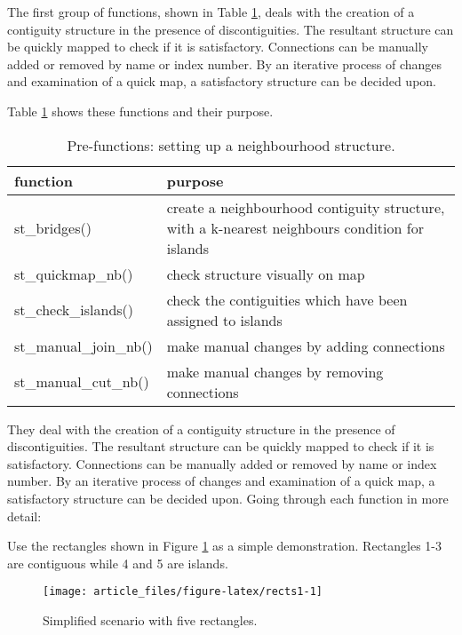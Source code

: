 The first group of functions, shown in Table \ref{tab:prefunc-latex}, deals with the creation
of a contiguity structure in the presence of discontiguities. The
resultant structure can be quickly mapped to check if it is
satisfactory. Connections can be manually added or removed by name or
index number. By an iterative process of changes and examination of a
quick map, a satisfactory structure can be decided upon.

Table \ref{tab:prefunc-latex} shows these functions and their purpose.

\begin{table}

\caption{\label{tab:prefunc-latex}Pre-functions: setting up a neighbourhood structure.}
\centering
\fontsize{9}{11}\selectfont
\begin{tabular}[t]{l|>{\raggedright\arraybackslash}p{7cm}}
\hline
function & purpose\\
\hline
st\_bridges() & create a neighbourhood contiguity structure, with a k-nearest neighbours condition for islands\\
\hline
st\_quickmap\_nb() & check structure visually on map\\
\hline
st\_check\_islands() & check the contiguities which have been assigned to islands\\
\hline
st\_manual\_join\_nb() & make manual changes by adding connections\\
\hline
st\_manual\_cut\_nb() & make manual changes by removing connections\\
\hline
\end{tabular}
\end{table}

They deal with the creation
of a contiguity structure in the presence of discontiguities. The
resultant structure can be quickly mapped to check if it is
satisfactory. Connections can be manually added or removed by name or
index number. By an iterative process of changes and examination of a
quick map, a satisfactory structure can be decided upon.
Going through each function in more detail:

Use the rectangles shown in Figure \ref{fig:rects1} as a simple demonstration. Rectangles 1-3
are contiguous while 4 and 5 are islands.

\begin{figure}

{\centering \texttt{[image: article\_files/figure-latex/rects1-1]} 

}

\caption{Simplified scenario with five rectangles. }\label{fig:rects1}
\end{figure}

